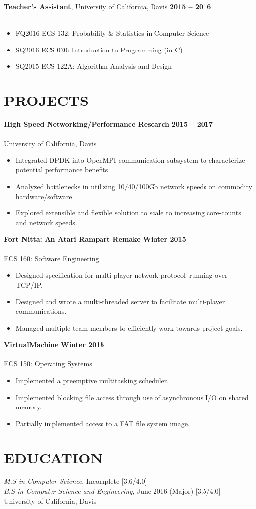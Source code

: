 \documentclass[10pt, center]{res} %
\newcommand{\bullets}[1]{
	\begin{itemize}[noitemsep]
		#1
	\end{itemize}
	\vspace{-6pt}
}
\newcommand{\experience}[5]{
	{\bf #1}, #2 \hfill {\bf #3} \\ \vspace{-10pt}
	\ifx\hfbuzz#4\hfbuzz
		\vspace{-4pt}
	\else
		{\vspace{-4pt} \\ #4}
	\fi
	\bullets{#5}
}
\newcommand{\project}[4]{
	{\bf #1} \hfill {\bf #3} \\ \vspace{-14pt} \\
	{\small #2}
	\bullets{#4}
}
\begin{document}
\begin{resume}
	\experience{Teacher's Assistant}{University of California, Davis}{2015 -- 2016}{}{
		\item[] \hspace{-12pt} FQ2016 ECS 132: Probability \& Statistics in Computer Science %
		\item[] \hspace{-12pt} SQ2016 ECS 030: Introduction to Programming (in C) %
		\item[] \hspace{-12pt} SQ2015 ECS 122A: Algorithm Analysis and Design %
	}

\section{PROJECTS}
    \project{High Speed Networking/Performance Research}{University of California, Davis}{2015 -- 2017}{
		\item Integrated DPDK into OpenMPI communication subsystem to characterize potential performance benefits
        \item Analyzed bottlenecks in utilizing 10/40/100Gb network speeds on commodity hardware/software
        \item Explored extensible and flexible solution to scale to increasing core-counts and network speeds.
	}

	\project{Fort Nitta: An Atari Rampart Remake}{ECS 160: Software Engineering}{Winter 2015}{
        \item Designed specification for multi-player network protocol--running over TCP/IP.
        \item Designed and wrote a multi-threaded server to facilitate multi-player communications.
        \item Managed multiple team members to efficiently work towards project goals.
    }

    \project{VirtualMachine}{ECS 150: Operating Systems}{Winter 2015}{
		\item Implemented a preemptive multitasking scheduler.
		\item Implemented blocking file access through use of asynchronous I/O on shared memory.
		\item Partially implemented access to a FAT file system image.
	}

\section{EDUCATION}
{\sl M.S in Computer Science}, Incomplete  \hfill [3.6/4.0]  \\
{\sl B.S in Computer Science and Engineering}, June 2016 \hfill (Major) [3.5/4.0]  \\
University of California, Davis


\end{resume}
\end{document}
